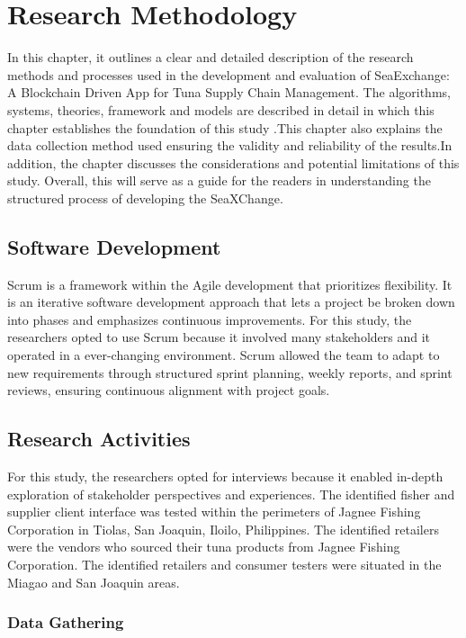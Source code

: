 \chapter{Research Methodology}
In this chapter, it outlines a clear and detailed description of the research methods and processes used in the development and evaluation of SeaExchange: A Blockchain Driven App for Tuna Supply Chain Management. The algorithms, systems, theories, framework and models are described in detail in which this chapter establishes the foundation of this study .This chapter also explains the data collection method used ensuring the validity and reliability of the results.In addition, the chapter discusses the considerations and potential limitations of this study. Overall, this will serve as a guide for the readers in understanding the structured process of developing the SeaXChange.

\section{Software Development}
Scrum is a framework within the Agile development that prioritizes flexibility. It is an iterative software development approach that lets a project be broken down into phases and emphasizes continuous improvements. For this study, the researchers opted to use Scrum  because it involved many stakeholders and it operated in a ever-changing environment. Scrum allowed the team to adapt to new requirements through structured sprint planning, weekly reports, and sprint reviews, ensuring continuous alignment with project goals.
\section{Research Activities}
For this study, the researchers opted for interviews because it enabled in-depth exploration of stakeholder perspectives and experiences. 
The identified fisher and supplier client interface was tested within the perimeters of Jagnee Fishing Corporation in Tiolas, San Joaquin, Iloilo, Philippines. The identified retailers were the vendors who sourced their tuna products from Jagnee Fishing Corporation. The identified retailers and consumer testers were situated in the Miagao and San Joaquin areas. 

\subsection{Data Gathering}

